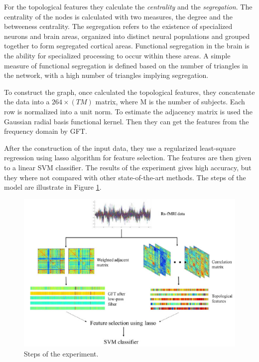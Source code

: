 For the topological features they calculate the \textit{centrality} and the \textit{segregation}. The centrality of the nodes is calculated with two measures, the degree and the betweeness centrality. The segregation refers to the existence of specialized neurons and brain areas, organized into distinct neural populations and grouped together to form segregated cortical areas. Functional segregation in the brain is the ability for specialized processing to occur within these areas. A simple measure of functional segregation is defined based on the number of triangles in the network, with a high number of triangles implying segregation.
\vspace{0.5cm}

To construct the graph, once calculated the topological features, they concatenate the data into a $ 264 \times (TM) $ matrix, where M is the number of subjects. Each row is normalized into a unit norm. To estimate the adjacency matrix is used the Gaussian radial basis functional kernel. Then they can get the features from the frequency domain by GFT. 
\vspace{0.5cm}

After the construction of the input data, they use a regularized least-square regression using lasso algorithm for feature selection. The features are then given to a linear SVM classifier. The results of the experiment gives high accuracy, but they where not compared with other state-of-the-art methods. The steps of the model are illustrate in Figure \ref{fig:diagram16}.
\vspace{0.5cm}

\begin{figure}[htbp]
	\centering
	\includegraphics[scale=0.8]{Immagini/integration.PNG}
	\caption{Steps of the experiment.}
	\label{fig:diagram16}
\end{figure}

